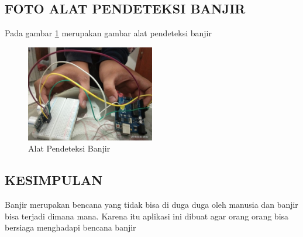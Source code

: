 \subsection{FOTO ALAT PENDETEKSI BANJIR}
Pada gambar \ref{labelgambar7} merupakan gambar alat pendeteksi banjir
\begin{figure}[htbp]
	\centering
	\includegraphics[width=0.5\textwidth]{figures/ALAT_PENDETEKSI_BANJIR/foto_alat_pendeteksi_banjir}
	\caption{Alat Pendeteksi Banjir}
	\label{labelgambar7}
	\end{figure}

\subsection{KESIMPULAN}
Banjir merupakan bencana yang tidak bisa di duga duga oleh manusia dan banjir bisa terjadi dimana mana. Karena itu aplikasi ini dibuat agar orang orang bisa bersiaga menghadapi bencana banjir
 